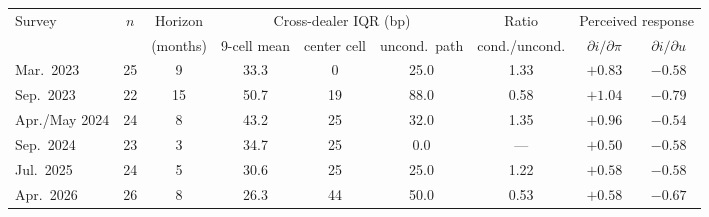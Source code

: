 \begin{tabular}{lcccccccc}
\toprule
Survey & $n$ & Horizon & \multicolumn{3}{c}{Cross-dealer IQR (bp)} & Ratio & \multicolumn{2}{c}{Perceived response}\\
\cmidrule(lr){4-6}\cmidrule(lr){8-9}
 & & (months) & 9-cell mean & center cell & uncond.\ path & cond./uncond. & $\partial i/\partial\pi$ & $\partial i/\partial u$\\
\midrule
Mar.\ 2023     & 25 & 9  & 33.3 & 0  & 25.0 & 1.33 & $+0.83$ & $-0.58$\\
Sep.\ 2023     & 22 & 15 & 50.7 & 19 & 88.0 & 0.58 & $+1.04$ & $-0.79$\\
Apr./May 2024  & 24 & 8  & 43.2 & 25 & 32.0 & 1.35 & $+0.96$ & $-0.54$\\
Sep.\ 2024     & 23 & 3  & 34.7 & 25 & 0.0  & ---  & $+0.50$ & $-0.58$\\
Jul.\ 2025     & 24 & 5  & 30.6 & 25 & 25.0 & 1.22 & $+0.58$ & $-0.58$\\
Apr.\ 2026     & 26 & 8  & 26.3 & 44 & 50.0 & 0.53 & $+0.58$ & $-0.67$\\
\bottomrule
\end{tabular}
